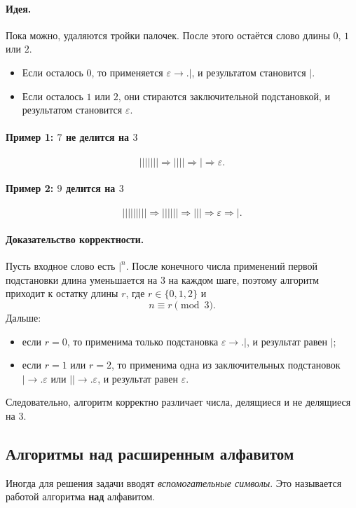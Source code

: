 \documentclass[12pt,a4paper]{article}
\begin{document}
\paragraph{Идея.}
Пока можно, удаляются тройки палочек. После этого остаётся слово длины $0$, $1$ или $2$.
\begin{itemize}
    \item Если осталось $0$, то применяется $\varepsilon\to. |$, и результатом становится $|$.
    \item Если осталось $1$ или $2$, они стираются заключительной подстановкой, и результатом становится $\varepsilon$.
\end{itemize}

\paragraph{Пример 1: $7$ не делится на $3$}
\[
||||||| \Rightarrow |||| \Rightarrow | \Rightarrow \varepsilon.
\]

\paragraph{Пример 2: $9$ делится на $3$}
\[
||||||||| \Rightarrow |||||| \Rightarrow ||| \Rightarrow \varepsilon \Rightarrow |.
\]

\paragraph{Доказательство корректности.}
Пусть входное слово есть $|^n$.
После конечного числа применений первой подстановки длина уменьшается на $3$ на каждом шаге, поэтому алгоритм приходит к остатку длины $r$, где $r\in\{0,1,2\}$ и
\[
n\equiv r \pmod 3.
\]
Дальше:
\begin{itemize}
    \item если $r=0$, то применима только подстановка $\varepsilon\to. |$, и результат равен $|$;
    \item если $r=1$ или $r=2$, то применима одна из заключительных подстановок $| \to. \varepsilon$ или $||\to.\varepsilon$, и результат равен $\varepsilon$.
\end{itemize}
Следовательно, алгоритм корректно различает числа, делящиеся и не делящиеся на $3$.

\subsection{Алгоритмы над расширенным алфавитом}
Иногда для решения задачи вводят \emph{вспомогательные символы}. Это называется работой алгоритма \textbf{над} алфавитом.
\end{document}
